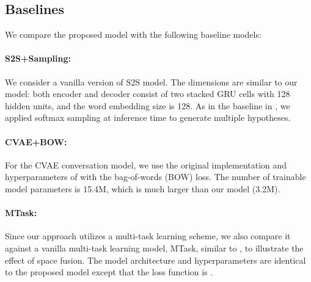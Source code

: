 \documentclass[11pt,a4paper]{article}
\begin{document}
\subsection{Baselines}
We compare the proposed model with the following baseline models:
\paragraph{S2S+Sampling:} We consider a vanilla version of S2S model. The dimensions are similar to our model: both encoder and decoder consist of two stacked GRU cells with 128 hidden units, and the word embedding size is 128. As in the baseline in \citet{zhao2017cvae}, we applied softmax sampling at inference time to generate multiple hypotheses.

\paragraph{CVAE+BOW:} For the CVAE conversation model, we use the original implementation and hyperparameters of \citet{zhao2017cvae} with the bag-of-words (BOW) loss. The number of trainable model parameters is 15.4M, which is much larger than our model (3.2M).

\paragraph{MTask:} Since our approach utilizes a multi-task learning scheme, we also compare it against a vanilla multi-task learning model, MTask, similar to \cite{luan2017mtask}, to illustrate the effect of space fusion. The model architecture and hyperparameters are identical to the proposed model except that the loss function is .
 
\end{document}
